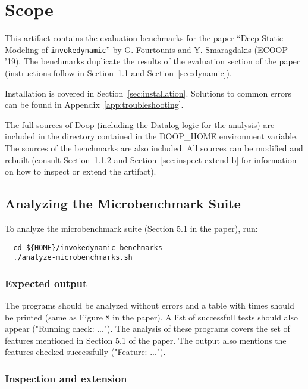 \documentclass[a4paper,UKenglish]{darts-v2019}
\newenvironment{scope}{\section{Scope}}{}
\newcommand{\invokedynamic}{\texttt{invokedynamic}}
\begin{document}
\begin{scope}
This artifact contains the evaluation benchmarks for the paper ``Deep
Static Modeling of \invokedynamic{}'' by G. Fourtounis and
Y. Smaragdakis (ECOOP '19). The benchmarks duplicate the results of
the evaluation section of the paper (instructions follow in
Section~\ref{sec:microbenchmark} and Section~\ref{sec:dynamic}).

Installation is covered in Section~\ref{sec:installation}. Solutions
to common errors can be found in Appendix~\ref{app:troubleshooting}.

The full sources of Doop (including the Datalog logic for the
analysis) are included in the directory contained in the DOOP\_HOME
environment variable. The sources of the benchmarks are also
included. All sources can be modified and rebuilt (consult
Section~\ref{sec:inspect-extend-a} and
Section~\ref{sec:inspect-extend-b} for information on how to inspect
or extend the artifact).

\subsection{Analyzing the Microbenchmark Suite}
\label{sec:microbenchmark}

To analyze the microbenchmark suite (Section 5.1 in the paper), run:

\begin{verbatim}
  cd ${HOME}/invokedynamic-benchmarks
  ./analyze-microbenchmarks.sh
\end{verbatim}

\subsubsection{Expected output}

The programs should be analyzed without errors and a table with times
should be printed (same as Figure 8 in the paper). A list of
successfull tests should also appear ("Running check: ..."). The
analysis of these programs covers the set of features mentioned in
Section 5.1 of the paper. The output also mentions the features
checked successfully ("Feature: ...").

\subsubsection{Inspection and extension}
\label{sec:inspect-extend-a}


\end{scope}
\end{document}
